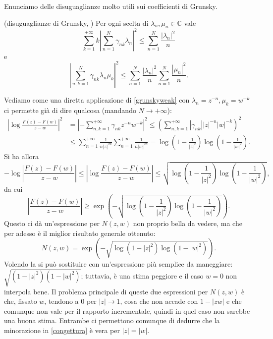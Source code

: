 Enunciamo delle disuguaglianze molto utili sui coefficienti di Grunsky.
\begin{thm}
  (disuguaglianze di Grunsky, \cite[Chapter 4.3, Inequalities (10) and (12)]{D}) Per ogni scelta di $\lambda_n, \mu_n \in \mathbb{C}$ vale
  \begin{equation}\label{grunskystrong}
    \sum_{k=1}^{+\infty} k\left|\sum_{n=1}^N\gamma_{nk}\lambda_n\right|^2 \le \sum_{n=1}^N \frac{|\lambda_n|^2}{n}
  \end{equation}
  e
  \begin{equation}\label{grunskyweak}
    \left|\sum_{n,k=1}^N \gamma_{nk}\lambda_n\mu_k\right|^2 \le \sum_{n=1}^N \frac{|\lambda_n|^2}{n}\sum_{n=1}^N \frac{|\mu_n|^2}{n}.
  \end{equation}
\end{thm}
Vediamo come una diretta applicazione di \eqref{grunskyweak} con $\lambda_n=z^{-n},\mu_k=w^{-k}$ ci permette già di dire qualcosa (mandando $N \longrightarrow +\infty$):
\begin{align*}
  \left|\log{\frac{F(z)-F(w)}{z-w}}\right|^2 &=\left|-\sum_{n,k=1}^{+\infty} \gamma_{nk}z^{-n}w^{-k}\right|^2 \le \left(\sum_{n,k=1}^{+\infty} |\gamma_{nk}||z|^{-n}|w|^{-k}\right)^2 \\
  &\le \sum_{n=1}^{+\infty} \frac{1}{n|z|^{2n}}\sum_{n=1}^{+\infty} \frac{1}{n|w|^{2n}}=\log\left(1-\frac{1}{|z|^2}\right)\log\left(1-\frac{1}{|w|^2}\right).
\end{align*}
Si ha allora
$$-\log{\left|\frac{F(z)-F(w)}{z-w}\right|} \le \left|\log{\frac{F(z)-F(w)}{z-w}}\right| \le \sqrt{\log\left(1-\frac{1}{|z|^2}\right)\log\left(1-\frac{1}{|w|^2}\right)},$$
da cui
$$\left|\frac{F(z)-F(w)}{z-w}\right| \ge \exp\left(-\sqrt{\log\left(1-\frac{1}{|z|^2}\right)\log\left(1-\frac{1}{|w|^2}\right)}\right).$$
Questo ci dà un'espressione per $N(z,w)$ non proprio bella da vedere, ma che per adesso è il miglior risultato generale ottenuto:
\begin{equation} \label{best}
  N(z,w)=\exp\left(-\sqrt{\log\left(1-|z|^2\right)\log\left(1-|w|^2\right)}\right).
\end{equation}
Volendo la si può sostituire con un'espressione più semplice da maneggiare: $\sqrt{(1-|z|^2)(1-|w|^2)}$; tuttavia, è una stima peggiore e il caso $w=0$ non interpola bene. Il problema principale di queste due espressioni per $N(z,w)$ è che, fissato $w$, tendono a $0$ per $|z| \longrightarrow 1$, cosa che non accade con $1-|zw|$ e che comunque non vale per il rapporto incrementale, quindi in quel caso non sarebbe una buona stima. Entrambe ci permettono comunque di dedurre che la minorazione in \eqref{congettura} è vera per $|z|=|w|$.

